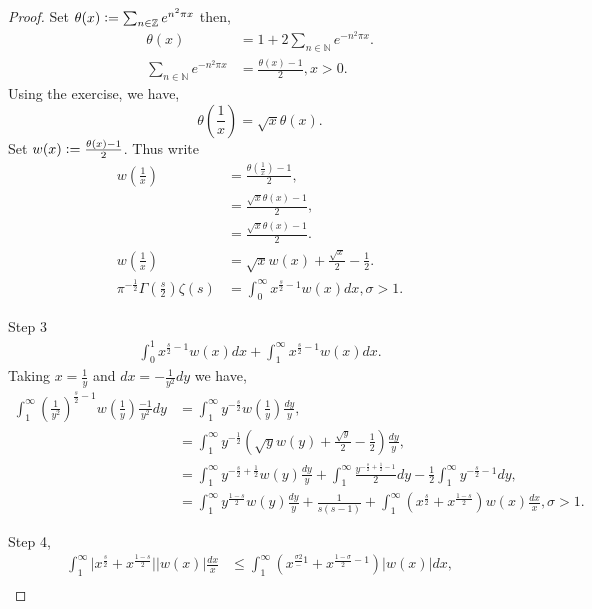 \documentclass{article}
\newcommand{\defeq}{\vcentcolon=}
\newcommand{\N}[0]{\mathbb{N}}
\newcommand{\Z}[0]{\mathbb{Z}}
\begin{document}
\begin{proof}
  Set $\theta(x)\defeq  \sum_{n\in\Z}e^{n^2\pi x}$ then,
  \begin{align*}
    \theta(x) &= 1+2\sum_{n\in\N}e^{-n^2\pi x}.\\
    \sum_{n\in\N}e^{-n^2\pi x}&= {\frac {\theta(x) - 1} 2}, x>0.
  \end{align*}
  Using the exercise, we have,
  \begin{equation*}
    \theta\left({\frac 1 x}\right) = \sqrt{x}\theta(x).
  \end{equation*}
  Set $w(x) \defeq {\frac {\theta(x)-1} 2}$. Thus write
  \begin{align*}
    w\left({\frac 1 x}\right) & = {\frac {\theta\left({\frac 1 x}\right)-1} 2},\\
    & = {\frac {\sqrt{x}\theta(x) - 1} 2},\\
    & = {\frac {\sqrt{x}\theta (x)-1} {2}}.\\
    w\left({\frac 1 x}\right)&= \sqrt{x}w(x)+{\frac {\sqrt{x}} 2}-{\frac 1 2}. \\
    \pi^{-{\frac 1 2}}\Gamma\left({\frac s 2}\right)\zeta(s) &= \int_0^\infty x^{{\frac s 2}-1}w(x)dx, \sigma>1.
  \end{align*}
  \par Step 3
  \begin{align*}
    \int_0^1 x^{{\frac s 2}-1}w(x)dx+\int_1^\infty x^{{\frac s 2}-1}w(x)dx.
  \end{align*}
  Taking $x = {\frac 1 y}$ and $dx = -{\frac 1 {y^2}}dy$ we have,
  \begin{align*}
    \int_1^\infty \left({\frac 1 {y^2}}\right)^{{\frac s 2}-1}w\left({\frac 1 y}\right){\frac {-1} {y^2}}dy & = \int_1^\infty y^{-{\frac s 2}}w\left({\frac 1 y}\right){\frac {dy} y},\\
    & = \int_1^\infty y^{-{\frac 1 2}}\left(\sqrt{y}w(y)+{\frac {\sqrt{y}} 2}-{\frac 1 2}\right){\frac {dy} y},\\
    & = \int_1^\infty y^{-{\frac s 2}+{\frac 1 2}}w(y){\frac {dy} y}+\int_1^\infty {\frac {y^{-{\frac s 2}+{\frac 1 2} -1 }} 2}dy - {\frac 1 2}\int_1^\infty y^{-{\frac s 2}-1}dy,\\
    & = \int_1^\infty y^{{\frac {1-s} 2}}w(y){\frac {dy} y}+{\frac 1 {s(s-1)}}+\int_1^\infty (x^{{\frac s 2}}+x^{\frac {1-s} 2})w(x){\frac {dx} x},\sigma>1.
  \end{align*}
  \par Step 4, 
  \begin{align*}
    \int_1^\infty \vert x^{{\frac s 2}}+x^{{\frac {1-s} 2}}\vert \vert w(x)\vert {\frac {dx} x} &\leq \int_1^\infty (x^{{\frac {\sigma 2}-1}}+x^{{\frac {1-\sigma} 2}-1})\vert w(x)\vert dx,\\

\end{align*}
\end{proof}
\end{document}
